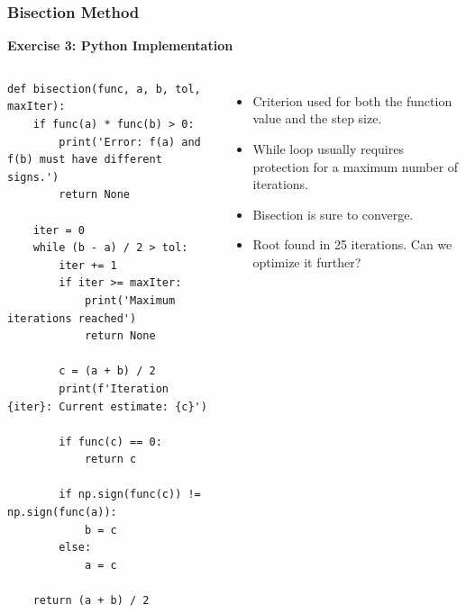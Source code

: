 \begin{frame}[fragile]
  \frametitle{Bisection Method}

  \textbf{Exercise 3: Python Implementation}
  \begin{columns}
    \begin{lstlisting}[style=tiny]
def bisection(func, a, b, tol, maxIter):
    if func(a) * func(b) > 0:
        print('Error: f(a) and f(b) must have different signs.')
        return None

    iter = 0
    while (b - a) / 2 > tol:
        iter += 1
        if iter >= maxIter:
            print('Maximum iterations reached')
            return None

        c = (a + b) / 2
        print(f'Iteration {iter}: Current estimate: {c}')

        if func(c) == 0:
            return c

        if np.sign(func(c)) != np.sign(func(a)):
            b = c
        else:
            a = c

    return (a + b) / 2
      \end{lstlisting}

    \vspace{-1cm}
    \begin{itemize}
      \item Criterion used for both the function value and the step size.
      \item While loop usually requires protection for a maximum number of iterations.
      \item Bisection is sure to converge.
      \item Root found in 25 iterations. Can we optimize it further?
    \end{itemize}
  \end{columns}
\end{frame}


